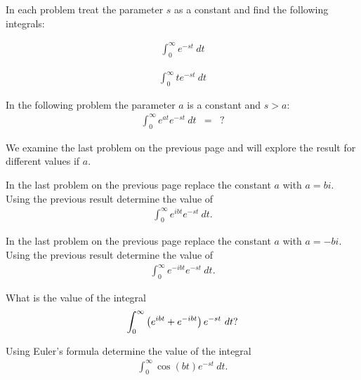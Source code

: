 \begin{problem}
\item In each problem treat the parameter $s$ as a constant and find
  the following integrals:
  \begin{subproblem}
    \item 
      \begin{eqnarray*}
        \int^\infty_0 e^{-st} ~ dt
      \end{eqnarray*}
      \vfill

    \item 
      \begin{eqnarray*}
        \int^\infty_0 te^{-st} ~ dt
      \end{eqnarray*}
      \vfill


    \item In the following problem the parameter $a$ is a constant and
      $s>a$:
      \begin{eqnarray*}
        \int^\infty_0 e^{at} e^{-st} ~ dt & = & ?
      \end{eqnarray*}
      \vfill

  \end{subproblem}


  \clearpage

\item We examine the last problem on the previous page and will
  explore the result for different values if $a$.

  \begin{subproblem}
  \item In the last problem on the previous page replace the constant
    $a$ with $a=bi$. Using the previous result determine the value of
    \begin{eqnarray*}
      \int^\infty_0 e^{ibt} e^{-st} ~ dt.
    \end{eqnarray*}
    \vfill

  \item In the last problem on the previous page replace the constant
    $a$ with $a=-bi$. Using the previous result determine the value of
    \begin{eqnarray*}
      \int^\infty_0 e^{-ibt} e^{-st} ~ dt.
    \end{eqnarray*}
    \vfill

  \item What is the value of the  integral
    \begin{eqnarray*}
      \int^\infty_0 \left( e^{ibt} + e^{-ibt} \right) e^{-st} ~ dt?
    \end{eqnarray*}
    \vfill

  \item Using Euler's formula determine the value of the integral
    \begin{eqnarray*}
      \int^\infty_0 \cos(bt) e^{-st} ~ dt.
    \end{eqnarray*}
    \vfill


  \end{subproblem}


  \end{problem}


